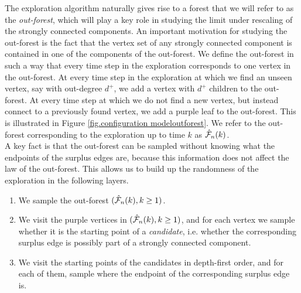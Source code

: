 The exploration algorithm naturally gives rise to a forest that we will refer to as the \emph{out-forest}, which will play a key role in studying the limit under rescaling of the strongly connected components. An important motivation for studying the out-forest is the fact that the vertex set of any strongly connected component is contained in one of the components of the out-forest. We define the out-forest in such a way that every time step in the exploration corresponds to one vertex in the out-forest. At every time step in the exploration at which we find an unseen vertex, say with out-degree $d^+$, we add a vertex with $d^+$ children to the out-forest. At every time step at which we do not find a new vertex, but instead connect to a previously found vertex, we add a purple leaf to the out-forest. This is illustrated in Figure \ref{fig.configuration modeloutforest}. We refer to the out-forest corresponding to the exploration up to time $k$ as $\hat{{\mathcal F}}_n(k)$.\\
A key fact is that the out-forest can be sampled without knowing what the endpoints of the surplus edges are, because this information does not affect the law of the out-forest. This allows us to build up the randomness of the exploration in the following layers.
\begin{enumerate}
    \item We sample the out-forest $(\hat{{\mathcal F}}_n(k),k\geq 1)$. 
    \item We visit the purple vertices in $(\hat{{\mathcal F}}_n(k),k\geq 1)$, and for each vertex we sample whether it is the starting point of a \emph{candidate}, i.e. whether the corresponding surplus edge is possibly part of a strongly connected component.
    \item We visit the starting points of the candidates in depth-first order, and for each of them, sample where the endpoint of the corresponding surplus edge is.
\end{enumerate}

